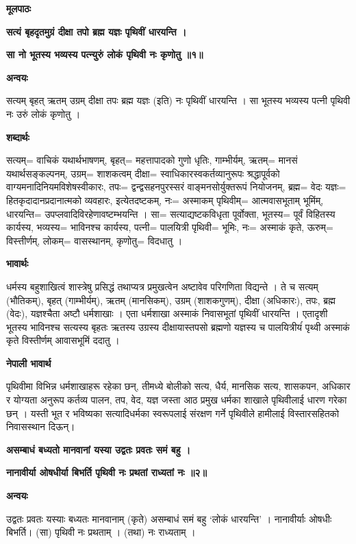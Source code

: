 \documentclass[11pt, a5paper]{article}
\begin{document}
\textbf{मूलपाठः}

\textbf{सत्यं बृहदृतमुग्रं दीक्षा तपो ब्रह्म यज्ञः पृथिवीं धारयन्ति ।}

\textbf{सा नो भूतस्य भव्यस्य पत्न्युरुं लोकं पृथिवी नः कृणोतु ॥१॥}

\textbf{अन्वयः}

सत्यम् बृहत् ऋतम् उग्रम् दीक्षा तपः ब्रह्म यज्ञः (इति) नः पृथिवीं धारयन्ति । सा भूतस्य भव्यस्य पत्नी पृथिवी नः उरुं लोकं कृणोतु ।

\textbf{शब्दार्थः}

सत्यम्= वाचिकं यथार्थभाषणम्, बृहत्= महत्तापादको गुणो धृतिः, गाम्भीर्यम्, ऋतम्= मानसं यथार्थसङ्कल्पनम्, उग्रम्= शाशकत्वम् दीक्षा= स्वाधिकारस्वकर्तव्यानुरूपः श्रद्धापूर्वको वाग्यमनादिनियमविशेषस्वीकारः, तपः= द्वन्द्वसहनपुरस्सरं वाङ्‌मनसोर्युक्तरूपं नियोजनम्, ब्रह्म= वेदः यज्ञः= हितकृदादानप्रदानात्मको व्यवहारः, इत्येतदष्टकम्, नः= अस्माकम् पृथिवीम्= आत्मवासभूताम् भूमिंम्, धारयन्ति= उपप्लवादिविरहेणावष्टम्भयन्ति । सा= सत्याद्यष्टकविधृता  पूर्वोक्ता, भूतस्य= पूर्वं विहितस्य कार्यस्य, भव्यस्य= भाविनश्च कार्यस्य, पत्नी= पालयित्री पृथिवी= भूमिः, नः= अस्माकं कृते, ऊरुम्= विस्त्तीर्णम्, लोकम्= वासस्थानम्, कृणोतु= विदधातु ।

\textbf{भावार्थः}

धर्मस्य बहुशाखित्वं शास्त्रेषु प्रसिद्धं तथाप्यत्र प्रमुखत्वेन अष्टावेव परिगणिता विद्यन्ते । ते च सत्यम् (भौतिकम्), बृहत् (गाम्भीर्यम्), ऋतम् (मानसिकम्), उग्रम् (शाशकगुणम्), दीक्षा (अधिकारः), तपः, ब्रह्म (वेदः), यज्ञश्चैता अष्टौ धर्मशाखाः । एता धर्मशाखा अस्माकं निवासभूतां पृथिवीं धारयन्ति । एतादृशी भूतस्य भाविनश्च सत्यस्य बृहतः ऋतस्य उग्रस्य दीक्षायास्तपसो ब्रह्मणो यज्ञस्य च पालयित्रीयंं पृथ्वी अस्माकं कृते विस्तीर्णम् आवासभूमिं ददातु ।

\textbf{नेपाली भावार्थ}

पृथिवीमा विभिन्न धर्मशाखाहरू रहेका छन्, तीमध्ये बोलीको सत्य, धैर्य, मानसिक सत्य, शासकपन, अधिकार र योग्यता अनुरूप कर्तव्य पालन, तप, वेद, यज्ञ जस्ता आठ प्रमुख धर्मका शाखाले पृथिवीलाई धारण गरेका छन् । यस्ती भूत र भविष्यका सत्यादिधर्मका स्वरूपलाई संरक्षण गर्ने पृथिवीले हामीलाई विस्तारसहितको निवासस्थान दिऊन्।

\textbf{असम्बाधं बध्यतो मानवानां यस्या उद्वतः प्रवतः समं बहु ।}

\textbf{नानावीर्या ओषधीर्या बिभर्ति पृथिवी नः प्रथतां राध्यतां नः ॥२॥}

\textbf{अन्वयः}

उद्वतः प्रवतः यस्याः बध्यतः मानवानाम् (कृते) असम्बाधं समं बहु ‘लोकं धारयन्ति’ । नानावीर्याः ‌ओषधीः बिभर्ति। (सा) पृथिवी नः प्रथताम् । (तथा) नः राध्यताम् ।
\end{document}
